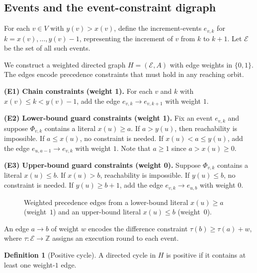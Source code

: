 \documentclass[final,3p,times]{elsarticle}
\theoremstyle{definition}
\newtheorem{definition}[theorem]{Definition}
\theoremstyle{remark}
\newcommand{\Z}{\mathbb{Z}}
\newcommand{\cE}{\mathcal{E}}
\begin{document}
\subsection*{Events and the event-constraint digraph}

For each $v\in V$ with $y(v)>x(v)$, define the increment-events $e_{v,k}$ for $k=x(v),\dots,y(v)-1$, representing the increment of $v$ from $k$ to $k+1$.
Let $\cE$ be the set of all such events.

We construct a weighted directed graph $H=(\cE,A)$ with edge weights in $\{0,1\}$.
The edges encode precedence constraints that must hold in any reaching orbit.

\medskip
\noindent\textbf{(E1) Chain constraints (weight 1).}
For each $v$ and $k$ with $x(v)\le k<y(v)-1$, add the edge $e_{v,k}\to e_{v,k+1}$ with weight $1$.

\medskip
\noindent\textbf{(E2) Lower-bound guard constraints (weight 1).}
Fix an event $e_{v,k}$ and suppose $\Phi_{v,k}$ contains a literal $x(u)\ge a$.
If $a>y(u)$, then reachability is impossible.
If $a\le x(u)$, no constraint is needed.
If $x(u)<a\le y(u)$, add the edge $e_{u,a-1}\to e_{v,k}$ with weight $1$.
Note that $a\ge 1$ since $a>x(u)\ge 0$.

\medskip
\noindent\textbf{(E3) Upper-bound guard constraints (weight 0).}
Suppose $\Phi_{v,k}$ contains a literal $x(u)\le b$.
If $x(u)>b$, reachability is impossible.
If $y(u)\le b$, no constraint is needed.
If $y(u)\ge b+1$, add the edge $e_{v,k}\to e_{u,b}$ with weight $0$.

\begin{figure}[t]
\centering
{}
\caption{Weighted precedence edges from a lower-bound literal $x(u)\ge a$ (weight~$1$) and an upper-bound literal $x(u)\le b$ (weight~$0$).}
\label{fig:edges}
\end{figure}

An edge $a\to b$ of weight $w$ encodes the difference constraint $\tau(b)\ge\tau(a)+w$, where $\tau\colon\cE\to\Z$ assigns an execution round to each event.

\begin{definition}[Positive cycle]
A directed cycle in $H$ is positive if it contains at least one weight-$1$ edge.
\end{definition}
\end{document}
